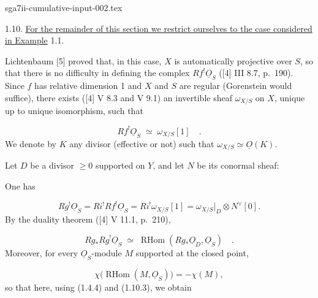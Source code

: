 \begin{filecontents*}{sga7ii-cumulative-input-002.tex}

1.10. \underline{For the remainder of this section we restrict ourselves to the
case considered in Example} 1.1.

Lichtenbaum [5] proved that, in this case, $X$ is automatically projective over
$S$, so that there is no difficulty in defining the complex
$Rf^{!}\underline{O}_S$ ([4] III 8.7, p.~190).  Since $f$ has relative dimension
1 and $X$ and $S$ are regular (Gorenstein would suffice), there exists ([4] V 8.3
and V 9.1) an invertible sheaf $\omega_{X/S}$ on $X$, unique up to unique
isomorphism, such that

\begin{equation}\tag{1.10.1}
Rf^{!}\underline{O}_S \;\simeq\; \omega_{X/S}[1] \quad .
\end{equation}
We denote by $K$ any divisor (effective or not) such that
$\omega_{X/S}\simeq\underline{O}(K)$.

Let $D$ be a divisor $\geq0$ supported on $Y$, and let $N$ be its conormal sheaf:

\begin{center}
\end{center}
One has

\begin{equation}\tag{1.10.2}
Rg^{!}\underline{O}_S
=Ri^{!}Rf^{!}\underline{O}_S
=Ri^{!}\omega_{X/S}[1]
=\omega_{X/S}\big|_D\otimes N^{\vee}[0].
\end{equation}
By the duality theorem ([4] V 11.1, p.~210),

\begin{equation}\tag{1.10.3}
Rg_*Rg^{!}\underline{O}_S
\;\simeq\;
\operatorname{RHom}(Rg_*\underline{O}_D,\underline{O}_S) \quad .
\end{equation}
Moreover, for every $\underline{O}_S$-module $M$ supported at the closed point,

\begin{equation}\tag{1.10.4}
\chi\bigl(\operatorname{RHom}(M,\underline{O}_S)\bigr)=-\chi(M),
\end{equation}
so that here, using (1.4.4) and (1.10.3), we obtain


\end{filecontents*}
